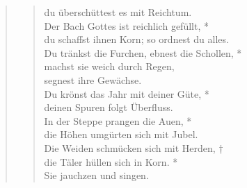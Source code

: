 \begin{quote}
\begin{verse}
du überschüttest es mit Reichtum.\\ 
\vin Der Bach Gottes ist reichlich gefüllt, *\\ 
\vin du schaffst ihnen Korn; so ordnest du alles.\\
Du tränkst die Furchen, ebnest die Schollen, *\\
machst sie weich durch Regen,\\
segnest ihre Gewächse.\\ 
\vin Du krönst das Jahr mit deiner Güte, *\\ 
\vin deinen Spuren folgt Überfluss.\\
In der Steppe prangen die Auen, *\\
die Höhen umgürten sich mit Jubel.\\ 
\vin Die Weiden schmücken sich mit Herden, †\\ 
\vin die Täler hüllen sich in Korn. *\\ 
\vin Sie jauchzen und singen.\\

\end{verse}
\end{quote}


\vspace{0.6cm}

\def\greinitialformat#1{{\fontsize{40}{40}\selectfont #1}}
\gresetfirstlineaboveinitial{\small \textcolor{red}{Jdt 16}}{}
\setaboveinitialseparation{0.72mm}


